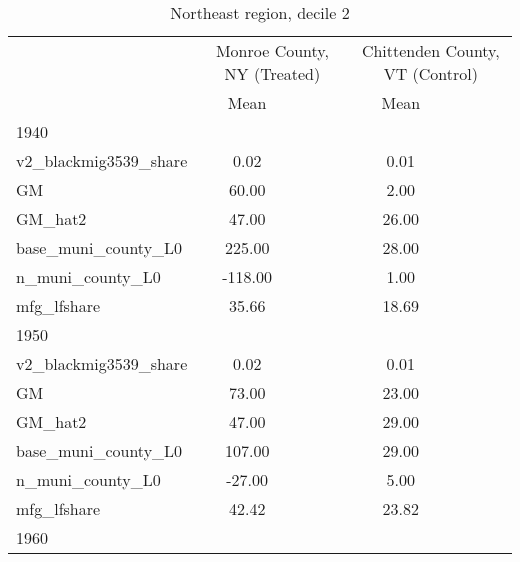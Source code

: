 \begin{table}[htbp]\centering
\def\sym#1{\ifmmode^{#1}\else\(^{#1}\)\fi}
\caption{Northeast region, decile 2 \label{tab1}}
\begin{tabular}{l*{2}{ccc}}
\toprule
                    &\multicolumn{3}{c}{Monroe County, NY (Treated)}&\multicolumn{3}{c}{Chittenden County, VT (Control)}\\
                    &        Mean&            &            &        Mean&            &            \\
\midrule
1940                &            &            &            &            &            &            \\
v2\_blackmig3539\_share&        0.02&            &            &        0.01&            &            \\
GM                  &       60.00&            &            &        2.00&            &            \\
GM\_hat2             &       47.00&            &            &       26.00&            &            \\
base\_muni\_county\_L0 &      225.00&            &            &       28.00&            &            \\
n\_muni\_county\_L0    &     -118.00&            &            &        1.00&            &            \\
mfg\_lfshare         &       35.66&            &            &       18.69&            &            \\
\midrule
1950                &            &            &            &            &            &            \\
v2\_blackmig3539\_share&        0.02&            &            &        0.01&            &            \\
GM                  &       73.00&            &            &       23.00&            &            \\
GM\_hat2             &       47.00&            &            &       29.00&            &            \\
base\_muni\_county\_L0 &      107.00&            &            &       29.00&            &            \\
n\_muni\_county\_L0    &      -27.00&            &            &        5.00&            &            \\
mfg\_lfshare         &       42.42&            &            &       23.82&            &            \\
\midrule
1960                &            &            &            &            &            &            \\

\end{tabular}
\end{table}
